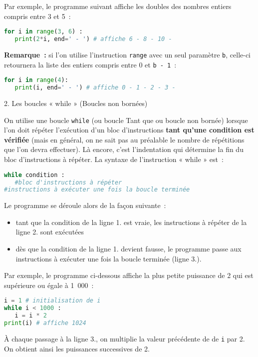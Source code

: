 \newpar
Par exemple, le programme suivant affiche les doubles des nombres entiers compris entre 3 et 5~:\\
\begin{lstlisting}[language=Python]
for i in range(3, 6) :
   print(2*i, end=' - ') # affiche 6 - 8 - 10 -
\end{lstlisting}
\textbf{Remarque~:} si l'on utilise l'instruction \texttt{range} avec un seul paramètre \texttt{b}, celle-ci retournera la liste des entiers compris entre 0 et \texttt{b - 1}~:
\begin{lstlisting}[language=Python]
for i in range(4):
   print(i, end=' - ') # affiche 0 - 1 - 2 - 3 -
\end{lstlisting}

\begin{h2}2. Les boucles « while » (Boucles non bornées) \end{h2}
On utilise une boucle \texttt{while} (ou boucle \og Tant que \fg{} ou boucle non bornée) lorsque l'on doit répéter l'exécution d'un bloc d'instructions \textbf{tant qu'une condition est vérifiée} (mais en général, on ne sait pas au préalable le nombre de répétitions que l'on devra effectuer). Là encore, c'est l'indentation qui détermine la fin du bloc d'instructions à répéter.
\newpar
La syntaxe de l'instruction « while » est~:
\begin{lstlisting}[language=Python]
while condition :
   #bloc d'instructions à répéter 
#instructions à exécuter une fois la boucle terminée
\end{lstlisting}
Le programme se déroule alors de la façon suivante~:
\begin{itemize}
     \item
     tant que la \og condition \fg{} de la ligne 1. est vraie, les \og instructions à répéter \fg{} de la ligne 2. sont exécutées \item
     dès que la \og condition \fg{} de la ligne 1. devient fausse, le programme passe aux \og instructions à exécuter une fois la boucle terminée \fg{} (ligne 3.).
\end{itemize}
Par exemple, le programme ci-dessous affiche la plus petite puissance de 2 qui est supérieure ou égale à 1~000~:
\begin{lstlisting}[language=Python]
i = 1 # initialisation de i
while i < 1000 :
   i = i * 2
print(i) # affiche 1024
\end{lstlisting}
À chaque passage à la ligne 3., on multiplie la valeur précédente de de \texttt{i} par 2. On obtient ainsi les puissances successives de 2.
